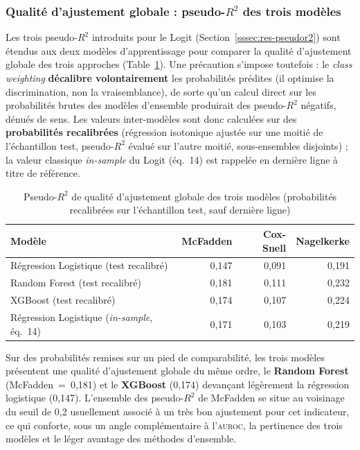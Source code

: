 \subsubsection{Qualité d'ajustement globale : pseudo-$R^2$ des trois modèles}
\label{sssec:res-pseudor2-comp}

Les trois pseudo-$R^2$ introduits pour le Logit
(Section~\ref{sssec:res-pseudor2}) sont étendus aux deux modèles d'apprentissage
pour comparer la qualité d'ajustement globale des trois approches
(Table~\ref{tab:res-pseudor2}). Une précaution s'impose toutefois : le
\emph{class weighting} \textbf{décalibre volontairement} les probabilités
prédites (il optimise la discrimination, non la vraisemblance), de sorte qu'un
calcul direct sur les probabilités brutes des modèles d'ensemble produirait des
pseudo-$R^2$ négatifs, dénués de sens. Les valeurs inter-modèles sont donc
calculées sur des \textbf{probabilités recalibrées} (régression isotonique
ajustée sur une moitié de l'échantillon test, pseudo-$R^2$ évalué sur l'autre
moitié, sous-ensembles disjoints) ; la valeur classique \emph{in-sample} du
Logit (éq.~14) est rappelée en dernière ligne à titre de référence.

\begin{table}[H]
\centering
\caption{Pseudo-$R^2$ de qualité d'ajustement globale des trois modèles
(probabilités recalibrées sur l'échantillon test, sauf dernière ligne)}
\label{tab:res-pseudor2}
\begin{tabular}{lrrr}
\toprule
\textbf{Modèle} & \textbf{McFadden} & \textbf{Cox-Snell} & \textbf{Nagelkerke} \\
\midrule
Régression Logistique (test recalibré) & 0,147 & 0,091 & 0,191 \\
Random Forest (test recalibré)         & 0,181 & 0,111 & 0,232 \\
XGBoost (test recalibré)               & 0,174 & 0,107 & 0,224 \\
\midrule
Régression Logistique (\emph{in-sample}, éq.~14) & 0,171 & 0,103 & 0,219 \\
\bottomrule
\end{tabular}
\end{table}

Sur des probabilités remises sur un pied de comparabilité, les trois modèles
présentent une qualité d'ajustement globale du même ordre, le
\textbf{Random Forest} (McFadden~=~0,181) et le \textbf{XGBoost}
(0,174) devançant légèrement la régression logistique (0,147). L'ensemble des
pseudo-$R^2$ de McFadden se situe au voisinage du seuil de 0,2 usuellement
associé à un très bon ajustement pour cet indicateur, ce qui conforte, sous un
angle complémentaire à l'\textsc{auroc}, la pertinence des trois modèles et le
léger avantage des méthodes d'ensemble.

